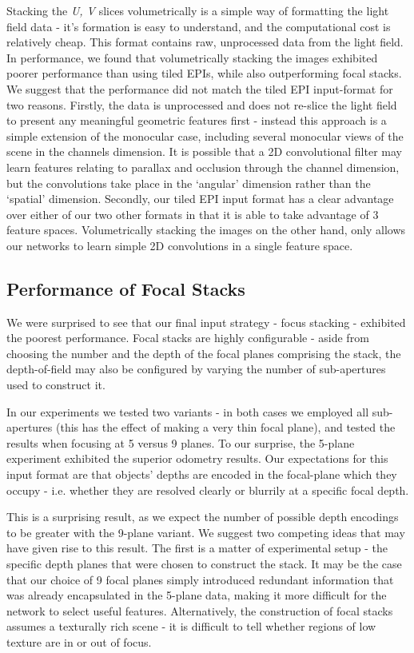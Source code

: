 Stacking the \textit{U, V} slices volumetrically is a simple way of formatting the light field data - it's formation is easy to understand, and the computational cost is relatively cheap. This format contains raw, unprocessed data from the light field. In performance, we found that volumetrically stacking the images exhibited poorer performance than using tiled EPIs, while also outperforming focal stacks. We suggest that the performance did not match the tiled EPI input-format for two reasons. Firstly, the data is unprocessed and does not re-slice the light field to present any meaningful geometric features first - instead this approach is a simple extension of the monocular case, including several monocular views of the scene in the channels dimension. It is possible that a 2D convolutional filter may learn features relating to parallax and occlusion through the channel dimension, but the convolutions take place in the `angular' dimension rather than the `spatial' dimension. Secondly, our tiled EPI input format has a clear advantage over either of our two other formats in that it is able to take advantage of 3 feature spaces. Volumetrically stacking the images on the other hand, only allows our networks to learn simple 2D convolutions in a single feature space. 

\subsection{Performance of Focal Stacks}
We were surprised to see that our final input strategy - focus stacking - exhibited the poorest performance. Focal stacks are highly configurable - aside from choosing the number and the depth of the focal planes comprising the stack, the depth-of-field may also be configured by varying the number of sub-apertures used to construct it. 

In our experiments we tested two variants - in both cases we employed all sub-apertures (this has the effect of making a very thin focal plane), and tested the results when focusing at 5 versus 9 planes. To our surprise, the 5-plane experiment exhibited the superior odometry results. Our expectations for this input format are that objects' depths are encoded in the focal-plane which they occupy - i.e. whether they are resolved clearly or blurrily at a specific focal depth. 

This is a surprising result, as we expect the number of possible depth encodings to be greater with the 9-plane variant. We suggest two competing ideas that may have given rise to this result. The first is a matter of experimental setup - the specific depth planes that were chosen to construct the stack. It may be the case that our choice of 9 focal planes simply introduced redundant information that was already encapsulated in the 5-plane data, making it more difficult for the network to select useful features. Alternatively, the construction of focal stacks assumes a texturally rich scene - it is difficult to tell whether regions of low texture are in or out of focus. 

